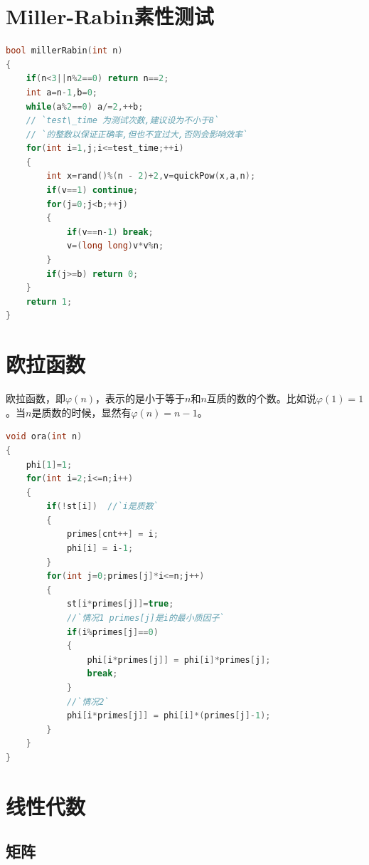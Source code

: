 \documentclass[a4paper]{book}
\begin{document}
\section{Miller-Rabin素性测试}
\begin{lstlisting}[language=c++,escapeinside=``]
bool millerRabin(int n) 
{
    if(n<3||n%2==0) return n==2;
    int a=n-1,b=0;
    while(a%2==0) a/=2,++b;
    // `test\_time 为测试次数,建议设为不小于8`
    // `的整数以保证正确率,但也不宜过大,否则会影响效率`
    for(int i=1,j;i<=test_time;++i) 
    {
        int x=rand()%(n - 2)+2,v=quickPow(x,a,n);
        if(v==1) continue;
        for(j=0;j<b;++j) 
        {
            if(v==n-1) break;
            v=(long long)v*v%n;
        }
        if(j>=b) return 0;
    }
    return 1;
}
\end{lstlisting}
\section{欧拉函数}
欧拉函数，即$\varphi(n)$，表示的是小于等于$n$和$n$互质的数的个数。比如说$\varphi(1)=1$。当$n$是质数的时候，显然有$\varphi(n)=n-1$。
\begin{lstlisting}[language=c++,escapeinside=``]
void ora(int n)
{
    phi[1]=1;
    for(int i=2;i<=n;i++)
    {
        if(!st[i])  //`i是质数`
        {
            primes[cnt++] = i;
            phi[i] = i-1;
        }
        for(int j=0;primes[j]*i<=n;j++)
        {
            st[i*primes[j]]=true;
            //`情况1 primes[j]是i的最小质因子`
            if(i%primes[j]==0)
            {
                phi[i*primes[j]] = phi[i]*primes[j];
                break;
            }
            //`情况2`
            phi[i*primes[j]] = phi[i]*(primes[j]-1);
        }
    }
}
\end{lstlisting}

\section{线性代数}
\subsection{矩阵}
\end{document}
